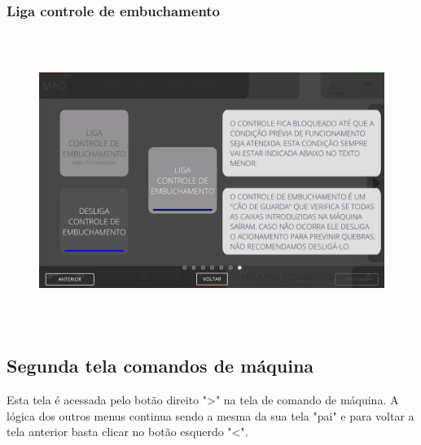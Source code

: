 \vspace*{\fill}

\newpage
\thispagestyle{fancy}

\vspace*{\fill}

\subsubsection{\small{Liga controle de embuchamento}}

\begin{figure}[h]
  \centering
  \includegraphics[width=576px,height=360px]{src/imagesFlexo/02-machine/e-7.png}
\end{figure}

\vspace*{\fill}

\newpage
\thispagestyle{fancy}

\vspace*{\fill}

\subsection{Segunda tela comandos de máquina}

Esta tela é acessada pelo botão direito "\textgreater" na tela de comando de máquina. A lógica dos outros menus continua sendo a mesma da sua tela "pai" e para voltar a tela anterior basta clicar no botão esquerdo "\textless{}".

\vspace{10pt}

